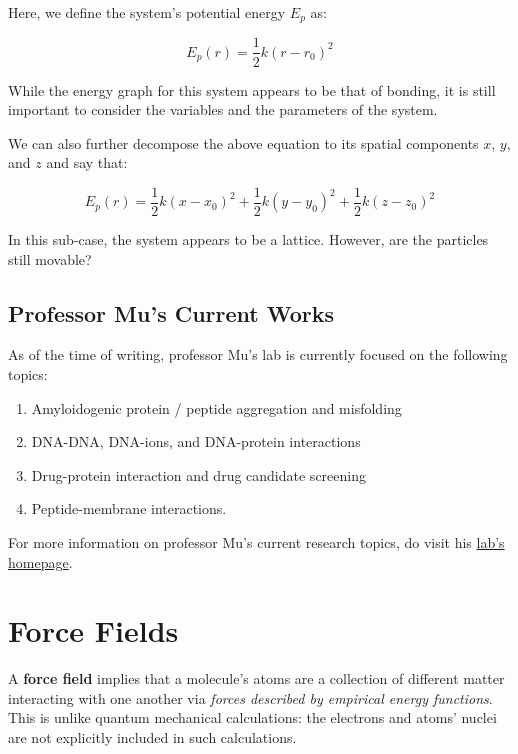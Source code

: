 \documentclass[
  letterpaper,
  DIV=11,
  numbers=noendperiod]{scrreprt}
\providecommand{\tightlist}{%
  \setlength{\itemsep}{0pt}\setlength{\parskip}{0pt}}\usepackage{longtable,booktabs,array}
\begin{document}
Here, we define the system's potential energy \(E_p\) as:

\begin{equation}
  E_p(r) = \frac{1}{2}k(r - r_0)^2
\end{equation}

While the energy graph for this system appears to be that of bonding, it
is still important to consider the variables and the parameters of the
system.

We can also further decompose the above equation to its spatial
components \(x\), \(y\), and \(z\) and say that:

\begin{equation}
E_p(r) = \frac{1}{2}k(x - x_0)^2 + \frac{1}{2}k(y - y_0)^2 + \frac{1}{2}k(z - z_0)^2
\end{equation}

In this sub-case, the system appears to be a lattice. However, are the
particles still movable?

\hypertarget{professor-mus-current-works-1}{%
\section{Professor Mu's Current
Works}\label{professor-mus-current-works-1}}

As of the time of writing, professor Mu's lab is currently focused on
the following topics:

\begin{enumerate}
\def\labelenumi{\arabic{enumi}.}
\tightlist
\item
  Amyloidogenic protein / peptide aggregation and misfolding
\item
  DNA-DNA, DNA-ions, and DNA-protein interactions
\item
  Drug-protein interaction and drug candidate screening
\item
  Peptide-membrane interactions.
\end{enumerate}

For more information on professor Mu's current research topics, do visit
his
\href{https://www.ntu.edu.sg/sbs/research/research-directory/Mu-Yuguang}{lab's
homepage}.

\hypertarget{force-fields}{%
\chapter{Force Fields}\label{force-fields}}

A \textbf{force field} implies that a molecule's atoms are a collection
of different matter interacting with one another via \emph{forces
described by empirical energy functions}. This is unlike quantum
mechanical calculations: the electrons and atoms' nuclei are not
explicitly included in such calculations.
\end{document}
